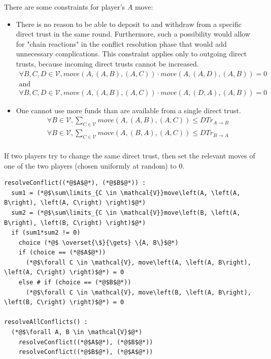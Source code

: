   There are some constraints for player's $A$ move:
  \begin{itemize}
    \item There is no reason to be able to deposit to and withdraw from a specific direct trust in the same round.
    Furthermore, such a possibility would allow for "chain reactions" in the conflict resolution phase that would add
    unnecessary complications.  This constraint applies only to outgoing direct trusts, because incoming direct trusts cannot
    be increased.
    \begin{gather*}
      \forall B, C, D \in \mathcal{V}, move\left(A, \left(A, B\right), \left(A, C\right) \right) \cdot move\left(A, \left(A,
      D\right), \left(A, B\right) \right) = 0 \\
      \mbox{and} \\
      \forall B, C, D \in \mathcal{V}, move\left(A, \left(A, B\right), \left(A, C\right) \right) \cdot move\left(A, \left(D,
      A\right), \left(A, B\right) \right) = 0
    \end{gather*}
  
    \item One cannot use more funds than are available from a single direct trust.
    \begin{gather*}
      \forall B \in \mathcal{V}, \sum\limits_{C \in \mathcal{V}} move\left(A, \left(A, B\right), \left(A, C\right) \right)
        \leq DTr_{A \rightarrow B} \\
      \forall B \in \mathcal{V}, \sum\limits_{C \in \mathcal{V}} move\left(A, \left(B, A\right), \left(A, C\right) \right)
        \leq DTr_{B \rightarrow A} \\
    \end{gather*}
  \end{itemize}
  
  If two players try to change the same direct trust, then set the relevant moves of one of the two players (chosen uniformly
  at random) to 0.
  \begin{lstlisting}[label=conflict, style=numbers]
resolveConflict((*@$A$@*), (*@$B$@*)) :
  sum1 = (*@$\sum\limits_{C \in \mathcal{V}}move\left(A, \left(A, B\right), \left(A, C\right) \right)$@*)
  sum2 = (*@$\sum\limits_{C \in \mathcal{V}}move\left(B, \left(A, B\right), \left(B, C\right) \right)$@*)
  if (sum1*sum2 != 0)
    choice (*@$ \overset{\$}{\gets} \{A, B\}$@*)
    if (choice == (*@$A$@*))
      (*@$\forall C \in \mathcal{V}, move\left(A, \left(A, B\right), \left(A, C\right) \right)$@*) = 0
    else # if (choice == (*@$B$@*))
      (*@$\forall C \in \mathcal{V}, move\left(B, \left(A, B\right), \left(B, C\right) \right)$@*) = 0

resolveAllConflicts() :
  (*@$\forall A, B \in \mathcal{V}$@*)
    resolveConflict((*@$A$@*), (*@$B$@*))
    resolveConflict((*@$B$@*), (*@$A$@*))
  \end{lstlisting}

